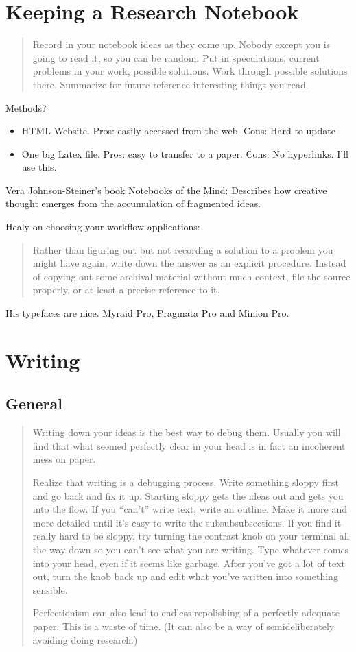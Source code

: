 \section{Keeping a Research Notebook}
\blockquote{Record in your notebook ideas as they come up. Nobody except you is going
to read it, so you can be random. Put in speculations, current problems in your
work, possible solutions. Work through possible solutions there. Summarize for
future reference interesting things you read.}

Methods?
\begin{itemize}
\item HTML Website. Pros: easily accessed from the web. Cons: Hard to update
\item One big Latex file. Pros: easy to transfer to a paper. Cons: No
hyperlinks. I'll use this.
\end{itemize}

Vera Johnson-Steiner's book Notebooks of the Mind: Describes how creative
thought emerges from the accumulation of fragmented ideas.

Healy \cite{healy2014choosing} on choosing your workflow applications:
\blockquote{Rather than figuring out but not recording a solution to a problem you might have
again, write down the answer as an explicit procedure. Instead of copying out some
archival material without much context, file the source properly, or at least a precise
reference to it.}
His typefaces are nice. Myraid Pro, Pragmata Pro and Minion Pro.

\section{Writing}

\subsection{General}
\blockquote{Writing down your ideas is the best way to debug them. Usually you will
find that what seemed perfectly clear in your head is in fact an incoherent
mess on paper.

Realize that writing is
a debugging process. Write something sloppy first and go back and fix it up.
Starting sloppy gets the ideas out and gets you into the flow. If you “can’t”
write text, write an outline. Make it more and more detailed until it’s easy
to write the subsubsubsections. If you find it really hard to be sloppy, try
turning the contrast knob on your terminal all the way down so you can’t
see what you are writing. Type whatever comes into your head, even if it
seems like garbage. After you’ve got a lot of text out, turn the knob back
up and edit what you’ve written into something sensible.

Perfectionism can also lead to endless repolishing of a perfectly adequate
paper. This is a waste of time. (It can also be a way of semideliberately
avoiding doing research.) 
}

